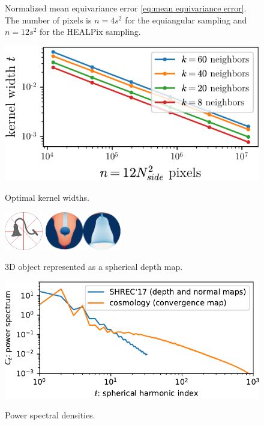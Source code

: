 \documentclass{article} %
\begin{document}
\begin{figure}
\begin{minipage}{0.6\linewidth}
		\caption{Normalized mean equivariance error \eqref{eq:mean equivariance error}. The number of pixels is $n = 4 s^2$ for the equiangular sampling and $n = 12 s^2$ for the HEALPix sampling.}
		\label{fig:equivariance_error}
	\end{minipage}
	\hfill
	\begin{minipage}{0.35\linewidth}
		\centering
		\includegraphics[width=\linewidth]{kernel_widths}
		\caption{Optimal kernel widths.}
		\label{fig:kernel_widths}
		\vspace{1em}
		\includegraphics[height=4.5em]{lamp_000018}
		\hfill
		\includegraphics[height=4.5em]{lamp_000018_sphere_nobar}
		\caption{3D object represented as a spherical depth map.}
		\label{fig:depthmap}
		\vspace{1em}
		\includegraphics[width=\linewidth]{spectrum}
		\caption{Power spectral densities.}
		\label{fig:spectrum}
	\end{minipage}
\end{figure}
\end{document}
